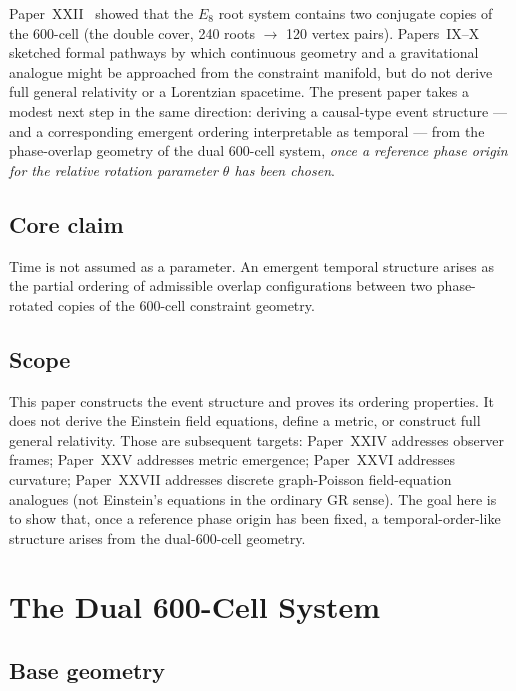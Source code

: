 \documentclass[12pt]{article}
\begin{document}
Paper~XXII~\citep{SmartXXII} showed that the $E_8$ root system contains two conjugate copies of the 600-cell (the double cover, 240 roots $\to$ 120 vertex pairs). Papers~IX--X~\citep{SmartIX, SmartX} sketched formal pathways by which continuous geometry and a gravitational analogue might be approached from the constraint manifold, but do not derive full general relativity or a Lorentzian spacetime. The present paper takes a modest next step in the same direction: deriving a causal-type event structure --- and a corresponding emergent ordering interpretable as temporal --- from the phase-overlap geometry of the dual 600-cell system, \emph{once a reference phase origin for the relative rotation parameter $\theta$ has been chosen}.

\subsection*{Core claim}

Time is not assumed as a parameter. An emergent temporal structure arises as the partial ordering of admissible overlap configurations between two phase-rotated copies of the 600-cell constraint geometry.

\subsection*{Scope}

This paper constructs the event structure and proves its ordering properties. It does not derive the Einstein field equations, define a metric, or construct full general relativity. Those are subsequent targets: Paper~XXIV addresses observer frames; Paper~XXV addresses metric emergence; Paper~XXVI addresses curvature; Paper~XXVII addresses discrete graph-Poisson field-equation analogues (not Einstein's equations in the ordinary GR sense). The goal here is to show that, once a reference phase origin has been fixed, a temporal-order-like structure arises from the dual-600-cell geometry.

\section{The Dual 600-Cell System}\label{sec:dual}

\subsection{Base geometry}
\end{document}
